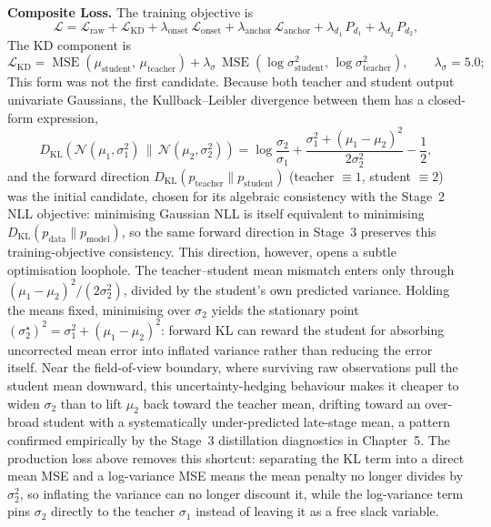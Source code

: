 \textbf{Composite Loss.} The training objective is
\[
\mathcal{L} = \mathcal{L}_{\mathrm{raw}} + \mathcal{L}_{\mathrm{KD}} + \lambda_{\mathrm{onset}}\,\mathcal{L}_{\mathrm{onset}} + \lambda_{\mathrm{anchor}}\,\mathcal{L}_{\mathrm{anchor}} + \lambda_{d_1}\,P_{d_1} + \lambda_{d_2}\,P_{d_2},
\]
The KD component is
\[
\mathcal{L}_{\mathrm{KD}} = \operatorname{MSE}(\mu_{\mathrm{student}},\,\mu_{\mathrm{teacher}}) + \lambda_\sigma\,\operatorname{MSE}(\log\sigma^2_{\mathrm{student}},\,\log\sigma^2_{\mathrm{teacher}}),\qquad \lambda_\sigma = 5.0;
\]
This form was not the first candidate. Because both teacher and student output univariate Gaussians, the Kullback--Leibler divergence between them has a closed-form expression,
\[
D_{\mathrm{KL}}\!\left(\mathcal{N}(\mu_1,\sigma_1^2)\,\|\,\mathcal{N}(\mu_2,\sigma_2^2)\right)
=\log\frac{\sigma_2}{\sigma_1}+\frac{\sigma_1^2+(\mu_1-\mu_2)^2}{2\sigma_2^2}-\frac{1}{2},
\]
and the forward direction \(D_{\mathrm{KL}}(p_{\mathrm{teacher}}\|p_{\mathrm{student}})\) (teacher \(\equiv 1\), student \(\equiv 2\)) was the initial candidate, chosen for its algebraic consistency with the Stage~2 NLL objective: minimising Gaussian NLL is itself equivalent to minimising \(D_{\mathrm{KL}}(p_{\mathrm{data}}\|p_{\mathrm{model}})\), so the same forward direction in Stage~3 preserves this training-objective consistency.
This direction, however, opens a subtle optimisation loophole. The teacher--student mean mismatch enters only through \((\mu_1-\mu_2)^2/(2\sigma_2^2)\), divided by the student's own predicted variance. Holding the means fixed, minimising over \(\sigma_2\) yields the stationary point \((\sigma_2^{\star})^{2}=\sigma_1^{2}+(\mu_1-\mu_2)^{2}\): forward KL can reward the student for absorbing uncorrected mean error into inflated variance rather than reducing the error itself. Near the field-of-view boundary, where surviving raw observations pull the student mean downward, this uncertainty-hedging behaviour makes it cheaper to widen \(\sigma_2\) than to lift \(\mu_2\) back toward the teacher mean, drifting toward an over-broad student with a systematically under-predicted late-stage mean, a pattern confirmed empirically by the Stage~3 distillation diagnostics in Chapter~5.
The production loss above removes this shortcut: separating the KL term into a direct mean MSE and a log-variance MSE means the mean penalty no longer divides by \(\sigma_2^2\), so inflating the variance can no longer discount it, while the log-variance term pins \(\sigma_2\) directly to the teacher \(\sigma_1\) instead of leaving it as a free slack variable.

